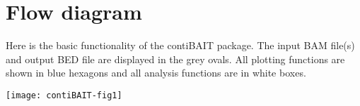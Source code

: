 \documentclass{article}
\begin{document}
\newpage

\section{Flow diagram}
Here is the basic functionality of the contiBAIT package.  The input BAM file(s) and output BED file are displayed in the grey ovals. All plotting functions are shown in blue hexagons and all analysis functions are in white boxes.


\begin{center}

\texttt{[image: contiBAIT-fig1]}
\end{center}
\end{document}
